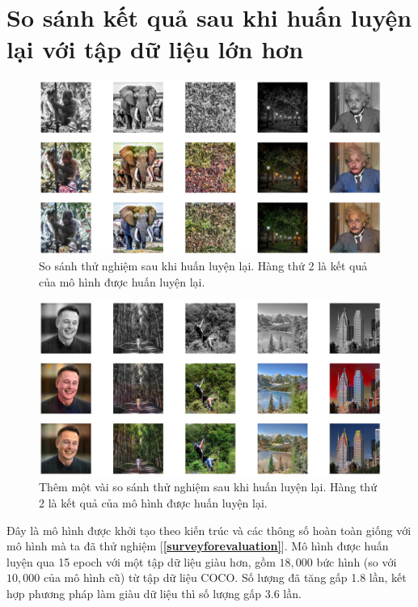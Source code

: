 \documentclass[a4paper, 12pt]{report}
\begin{document}
\section{So sánh kết quả sau khi huấn luyện lại với tập dữ liệu lớn hơn}\label{enhance_experiments}

\begin{figure}[!h]
\captionsetup{width=0.8\textwidth}
\centering
\includegraphics[width=15cm]{images/enhance.png}
\caption{So sánh thử nghiệm sau khi huấn luyện lại. Hàng thứ 2 là kết quả của mô hình được huấn luyện lại.}
\label{fig:enhance1}
\end{figure}

\begin{figure}[!h]
\captionsetup{width=0.8\textwidth}
\centering
\includegraphics[width=15cm]{images/enhance2.png}
\caption{Thêm một vài so sánh thử nghiệm sau khi huấn luyện lại. Hàng thứ 2 là kết quả của mô hình được huấn luyện lại.}
\label{fig:enhance2}
\end{figure}

Đây là mô hình được khởi tạo theo kiến trúc và các thông số hoàn toàn giống với mô hình mà ta đã thử nghiệm [\textbf{\ref{surveyforevaluation}}].
Mô hình được huấn luyện qua 15 epoch với một tập dữ liệu giàu hơn, gồm $18,000$ bức hình (so với $10,000$ của mô hình cũ) từ tập dữ liệu COCO.
Số lượng đã tăng gấp 1.8 lần, kết hợp phương pháp làm giàu dữ liệu thì số lượng gấp 3.6 lần.\vspace{5pt}
\end{document}
